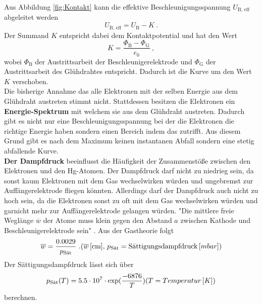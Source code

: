 Aus Abbildung \eqref{fig:Kontakt} kann die effektive Beschleunigungsspannung $U_\text{B, eff}$ abgeleitet werden
\begin{equation*}
	U_\text{B, eff} = U_\text{B} - K \ .
\end{equation*}
Der Summand $K$ entspricht dabei dem Kontaktpotential und hat den Wert
\begin{equation*}
	K = \frac{\Phi_\text{B} - \Phi_\text{G}}{e_0} \ ,
	\label{eqn:K}
\end{equation*}
wobei $\Phi_\text{B}$ der Austrittsarbeit der Beschleunigerelektrode und $\Phi_\text{G}$ der Austrittsarbeit des Glühdrahtes entspricht. Dadurch ist die Kurve um den Wert $K$ verschoben. \\
Die bisherige Annahme das alle Elektronen mit der selben Energie aus dem Glühdraht austreten stimmt nicht. Stattdessen besitzen die Elektronen ein \textbf{Energie-Spektrum} mit welchem sie aus dem Glühdraht austreten. Dadurch gibt es nicht nur eine Beschleunigungsspannung bei der die Elektronen die richtige Energie haben sondern einen Bereich indem das zutrifft. Aus diesem Grund gibt es nach dem Maximum keinen instantanen Abfall sondern eine stetig abfallende Kurve. \\
\textbf{Der Dampfdruck} beeinflusst die Häufigkeit der Zusammenstöße zwischen den Elektronen und den Hg-Atomen. Der Dampfdruck darf nicht zu niedrieg sein, da sonst kaum Elektronen mit dem Gas wechselwirken würden und ungebremst zur Auffängerelektrode fliegen könnten. Allerdings darf der Dampfdruck auch nicht zu hoch sein, da die Elektronen sonst zu oft mit dem Gas wechselwirken würden und garnicht mehr zur Auffängerelektrode gelangen würden. "Die mittlere freie Weglänge $\overline{w}$ der Atome muss klein gegen den Abstand $a$ zwischen Kathode und Beschleunigerelektrode sein" \cite[6]{sample}. Aus der Gastheorie folgt
\begin{equation*}
	\overline{w} = \frac{0.0029}{p_\text{Sät}} \ . \\
	\label{eqn:w}
	(\overline{w}\, [\text{cm}],\, p_\text{Sät} = \text{Sättigungsdampfdruck}\, [mbar])
\end{equation*}
Der Sättigungsdampfdruck lässt sich über
\begin{equation*}
	p_\text{Sät}(T) = 5.5 \cdot 10^7 \cdot \exp(\frac{-6876}{T}) \\
	\label{eqn:p}
	(T = Temperatur\, [K])
\end{equation*}
berechnen.

























